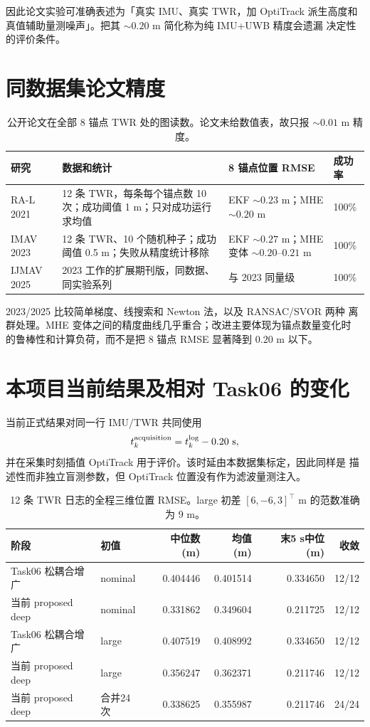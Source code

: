\documentclass[11pt,a4paper]{ctexart}
\begin{document}
因此论文实验可准确表述为「真实 IMU、真实 TWR，加 OptiTrack 派生高度和
真值辅助量测噪声」。把其 $\sim0.20$ m 简化称为纯 IMU+UWB 精度会遗漏
决定性的评价条件。

\section{同数据集论文精度}

\begin{table}[H]
\centering
\small
\caption{公开论文在全部 8 锚点 TWR 处的图读数。论文未给数值表，故只报
$\sim0.01$ m 精度。}
\begin{tabular}{p{2.2cm}p{4.2cm}p{3.2cm}p{2.2cm}}
\toprule
研究 & 数据和统计 & 8 锚点位置 RMSE & 成功率\\
\midrule
RA-L 2021 & 12 条 TWR，每条每个锚点数 10 次；成功阈值 1 m；只对成功运行求均值
& EKF $\sim0.23$ m；MHE $\sim0.20$ m & 100\%\\
IMAV 2023 & 12 条 TWR、10 个随机种子；成功阈值 0.5 m；失败从精度统计移除
& EKF $\sim0.27$ m；MHE 变体 $\sim0.20$--$0.21$ m & 100\%\\
IJMAV 2025 & 2023 工作的扩展期刊版，同数据、同实验系列
& 与 2023 同量级 & 100\%\\
\bottomrule
\end{tabular}
\end{table}

2023/2025 比较简单梯度、线搜索和 Newton 法，以及 RANSAC/SVOR 两种
离群处理。MHE 变体之间的精度曲线几乎重合；改进主要体现为锚点数量变化时
的鲁棒性和计算负荷，而不是把 8 锚点 RMSE 显著降到 $0.20$ m 以下。

\section{本项目当前结果及相对 Task06 的变化}

当前正式结果对同一行 IMU/TWR 共同使用
\begin{equation}
 t_k^{\rm acquisition}=t_k^{\rm log}-0.20\ \mathrm{s},
\end{equation}
并在采集时刻插值 OptiTrack 用于评价。该时延由本数据集标定，因此同样是
描述性而非独立盲测参数，但 OptiTrack 位置没有作为滤波量测注入。

\begin{table}[H]
\centering
\small
\caption{12 条 TWR 日志的全程三维位置 RMSE。large 初差
$[6,-6,3]^\top$ m 的范数准确为 9 m。}
\begin{tabular}{llrrrr}
\toprule
阶段 & 初值 & 中位数 (m) & 均值 (m) & 末5 s中位 (m) & 收敛\\
\midrule
Task06 松耦合增广 & nominal & 0.404446 & 0.401514 & 0.334650 & 12/12\\
当前 proposed deep & nominal & 0.331862 & 0.349604 & 0.211725 & 12/12\\
Task06 松耦合增广 & large & 0.407519 & 0.408992 & 0.334650 & 12/12\\
当前 proposed deep & large & 0.356247 & 0.362371 & 0.211746 & 12/12\\
当前 proposed deep & 合并24次 & 0.338625 & 0.355987 & 0.211746 & 24/24\\
\bottomrule
\end{tabular}
\end{table}
\end{document}
